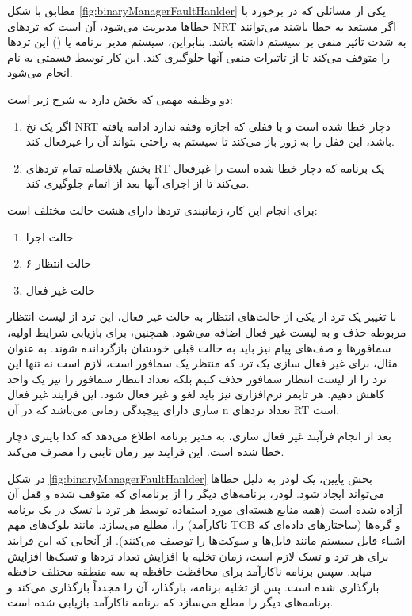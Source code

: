 \documentclass[10pt, a4paper]{article}
\begin{document}
مطابق با شکل \ref{fig:binaryManagerFaultHanlder} یکی از مسائلی که در برخورد با
خطا‌ها مدیریت می‌شود، آن است که ترد‌های NRT اگر مستعد به خطا باشند می‌توانند به
شدت تاثیر منفی بر سیستم داشته باشد. بنابراین، سیستم مدیر برنامه یا () این ترد‌ها را متوقف می‌کند تا از تاثیرات منفی آنها جلوگیری کند. این
کار توسط قسمتی به نام  انجام می‌شود.

دو وظیفه مهمی که بخش  دارد به شرح زیر است:

\begin{enumerate}
    \item اگر یک نخ NRT دچار خطا شده است و با قفلی که اجازه وقفه ندارد ادامه
    یافته باشد، این قفل را به زور باز می‌کند تا سیستم به راحتی بتواند آن را
    غیرفعال کند.
    \item بخش  بلافاصله تمام ترد‌های RT یک برنامه که دچار خطا
    شده است را غیرفعال می‌کند تا از اجرای آنها بعد از اتمام  جلوگیری کند.
\end{enumerate}

برای انجام این کار، زمانبندی ترد‌ها دارای هشت حالت مختلف است:

\begin{enumerate}
    \item حالت اجرا
    \item ۶ حالت انتظار
    \item حالت غیر فعال
\end{enumerate}


با تغییر یک ترد از یکی از حالت‌های انتظار به حالت غیر فعال، این ترد از لیست
انتظار مربوطه حذف و به لیست غیر فعال اضافه می‌شود. همچنین، برای بازیابی شرایط
اولیه، سمافور‌ها و صف‌های پیام نیز باید به حالت قبلی خودشان بازگردانده شوند. به
عنوان مثال، برای غیر فعال سازی یک ترد که منتظر یک سمافور است، لازم است نه تنها
این ترد را از لیست انتظار سمافور حذف کنیم بلکه تعداد انتظار سمافور را نیز یک
واحد کاهش دهیم. هر تایمر نرم‌افزاری نیز باید لغو و غیر فعال شود. این فرایند غیر
فعال سازی دارای پیچیدگی زمانی  می‌باشد که در آن n تعداد ترد‌های RT است.

بعد از انجام فرآیند غیر فعال سازی،  به مدیر برنامه اطلاع
می‌دهد که کدا باینری دچار خطا شده است. این فرایند نیز زمان ثابتی را مصرف می‌کند.

در شکل \ref{fig:binaryManagerFaultHanlder} بخش پایین، یک لودر به دلیل خطاها
می‌تواند ایجاد شود. لودر، برنامه‌های دیگر را از برنامه‌ای که متوقف شده و قفل آن
آزاده شده است (همه منابع هسته‌ای مورد استفاده توسط هر ترد یا تسک در یک برنامه
ناکارآمد) را، مطلع می‌سازد. مانند بلوک‌های مهم TCB و گره‌ها (ساختار‌های داده‌ای
که اشیاء فایل سیستم مانند فایل‌ها و سوکت‌ها را توصیف می‌کنند). از آنجایی که این
فرایند برای هر ترد و تسک لازم است، زمان تخلیه با افزایش تعداد ترد‌ها و تسک‌ها
افزایش میابد. سپس برنامه ناکارآمد برای محافظت حافظه به سه منطقه مختلف حافظه
بارگذاری شده است. پس از تخلیه برنامه، بارگذار، آن را مجدداً بارگذاری می‌کند و
برنامه‌های دیگر را مطلع می‌سازد که برنامه ناکارآمد بازیابی شده است.
\end{document}
